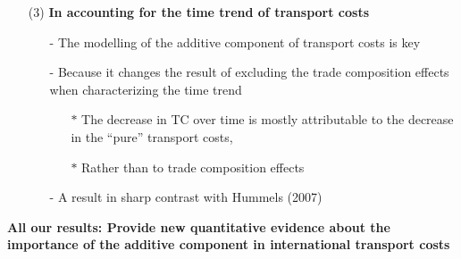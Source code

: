 \documentclass[10 pt,Helvetica, french]{beamer}
\begin{document}
\begin{frame}
\begin{itemize}
\item[(3)] \textbf{In accounting for the time trend of transport costs} \vspace{0.2cm}
\begin{itemize}
\item[-] The modelling of the additive component of transport costs is key \vspace{0.1cm}
\item[-] Because it changes the result of excluding the trade composition effects when characterizing the time trend \vspace{0.1cm}
\begin{itemize}
\item[$\ast$] The decrease in TC over time is mostly attributable to the decrease in the ``pure'' transport costs,  \vspace{0.1cm}
\item[$\ast$] Rather than to trade composition effects  \vspace{0.1cm}
\end{itemize}
\item[-] A result in sharp contrast with Hummels (2007) \vspace{0.2cm}
\end{itemize}
\end{itemize}
\textbf{All our results: Provide new quantitative evidence about the importance of the additive component in international transport costs}

\end{frame}
\end{document}
